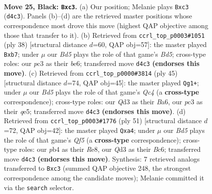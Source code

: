\documentclass[11pt]{article}
\begin{document}
\clearpage

\begin{figure}[p]\centering
\begin{subfigure}{0.46\textwidth}\centering
\resizebox{\linewidth}{!}{%
\newchessgame
\chessboard[
  setfen={r7/2p2kpp/3p4/8/pP1b2Q1/2Pq4/PR3PPP/2B3K1 b - - 4 25},
  showmover=false,
  pgfstyle=straightmove, color=movearrow, markmove={d4-c3}
]}
\caption{}
\end{subfigure}\hfill
\begin{subfigure}{0.46\textwidth}\centering
\resizebox{\linewidth}{!}{%
\newchessgame
\chessboard[
  setfen={r5k1/1p3ppp/4b3/p2B4/P2Q4/3P4/1PP3Pq/R4K2 w - - 1 20},
  showmover=false,
  pgfstyle=straightmove, color=movearrow, markmove={d5-b7}
]}
\caption{}
\end{subfigure}
\\[4pt]
\begin{subfigure}{0.46\textwidth}\centering
\resizebox{\linewidth}{!}{%
\newchessgame
\chessboard[
  setfen={r5k1/5ppp/b1p1p3/p1q1Q3/2P2P2/1B6/PP1R2PP/2K5 b - - 1 23},
  showmover=false,
  pgfstyle=straightmove, color=movearrow, markmove={c5-g1}
]}
\caption{}
\end{subfigure}\hfill
\begin{subfigure}{0.46\textwidth}\centering
\resizebox{\linewidth}{!}{%
\newchessgame
\chessboard[
  setfen={4r1k1/p4pp1/2b4p/2Pp4/P4q2/2PB4/2P2PPQ/5RK1 b - - 1 26},
  showmover=false,
  pgfstyle=straightmove, color=movearrow, markmove={f4-a4}
]}
\caption{}
\end{subfigure}
\caption{\textbf{Move 25, Black: \texttt{Bxc3}.} (a) Our position; Melanie plays \texttt{Bxc3} (\texttt{d4c3}). Panels (b)--(d) are the retrieved master positions whose correspondence most drove this move (highest QAP objective among those that transfer to it). (b) Retrieved from \texttt{ccrl\_top\_p0003\#1051} (ply 38) [structural distance $d$=60, QAP obj=57]: the master played \texttt{Bxb7}; under $\mu$ our \emph{Bd5} plays the role of that game's \emph{Bd5}; cross-type roles: our \emph{p}c3 as their \emph{b}e6; transferred move \texttt{d4c3} \textbf{(endorses this move)}. (c) Retrieved from \texttt{ccrl\_top\_p0000\#3814} (ply 45) [structural distance $d$=74, QAP obj=45]: the master played \texttt{Qg1+}; under $\mu$ our \emph{Bd5} plays the role of that game's \emph{Qc4} (a \textbf{cross-type} correspondence); cross-type roles: our \emph{Q}d3 as their \emph{B}a6, our \emph{p}c3 as their \emph{q}e5; transferred move \texttt{d4c3} \textbf{(endorses this move)}. (d) Retrieved from \texttt{ccrl\_top\_p0003\#1776} (ply 51) [structural distance $d$=72, QAP obj=42]: the master played \texttt{Qxa4}; under $\mu$ our \emph{Bd5} plays the role of that game's \emph{Qf5} (a \textbf{cross-type} correspondence); cross-type roles: our \emph{p}b4 as their \emph{R}e8, our \emph{Q}d3 as their \emph{B}c6; transferred move \texttt{d4c3} \textbf{(endorses this move)}. Synthesis: 7 retrieved analogs transferred to \texttt{Bxc3} (summed QAP objective 248, the strongest correspondence among the candidate moves); Melanie committed it via the \texttt{search} selector.}
\label{fig:thought-m49}
\end{figure}
\end{document}
